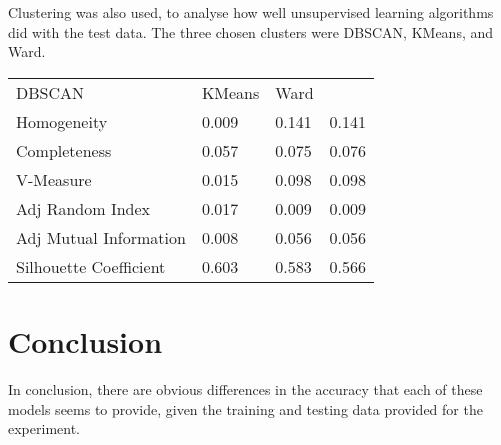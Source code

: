 \documentclass[11pt]{article}
\begin{document}
Clustering was also used, to analyse how well unsupervised learning algorithms did with the test data. The three chosen clusters were DBSCAN, KMeans, and Ward.

\begin{table}[h]
\centering
\begin{tabular}{| l | l | l | l |}
DBSCAN                 & KMeans & Ward  &       \\
Homogeneity            & 0.009  & 0.141 & 0.141 \\
Completeness           & 0.057  & 0.075 & 0.076 \\
V-Measure              & 0.015  & 0.098 & 0.098 \\
Adj Random Index       & 0.017  & 0.009 & 0.009 \\
Adj Mutual Information & 0.008  & 0.056 & 0.056 \\
Silhouette Coefficient & 0.603  & 0.583 & 0.566
\end{tabular}
\end{table}


\section{Conclusion}
In conclusion, there are obvious differences in the accuracy that each of these models seems to provide, given the training and testing data provided for the experiment.
\end{document}
